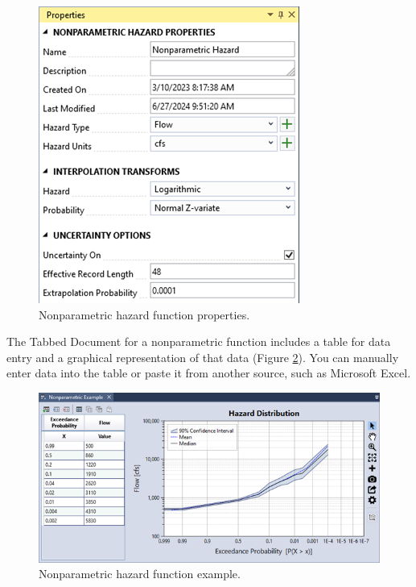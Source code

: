 \documentclass[
]{book}
\begin{document}
\begin{figure}

{\centering \includegraphics{images/figure65} 

}

\caption{Nonparametric hazard function properties.}\label{fig:figure-65}
\end{figure}

The Tabbed Document for a nonparametric function includes a table for data entry and a graphical representation of that data (Figure \ref{fig:figure-66}). You can manually enter data into the table or paste it from another source, such as Microsoft Excel.

\begin{figure}

{\centering \includegraphics{images/figure66} 

}

\caption{Nonparametric hazard function example.}\label{fig:figure-66}
\end{figure}
\end{document}
